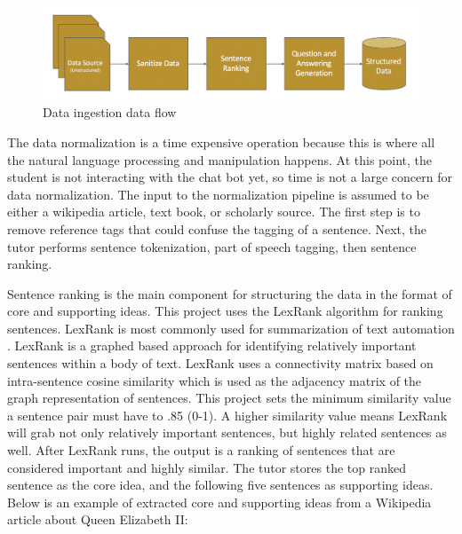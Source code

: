 \documentclass{sigchi}
\begin{document}
  \begin{figure}[!t]
  \centering
  \includegraphics[width=6.0in]{normalization}
  \caption{Data ingestion data flow}
  \label{data-normalization}
  \end{figure}

  The data normalization is a time expensive operation because this is where all the natural language processing and manipulation happens. At this point, the student is not interacting with the chat bot yet, so time is not a large concern for data normalization. The input to the normalization pipeline is assumed to be either a wikipedia article, text book, or scholarly source. The first step is to remove reference tags that could confuse the tagging of a sentence. Next, the tutor performs sentence tokenization, part of speech tagging, then sentence ranking.

  Sentence ranking is the main component for structuring the data in the format of core and supporting ideas. This project uses the LexRank algorithm for ranking sentences. LexRank is most commonly used for summarization of text automation \cite{LexRank}. LexRank is a graphed based approach for identifying relatively important sentences within a body of text. LexRank uses a connectivity matrix based on intra-sentence cosine similarity which is used as the adjacency matrix of the graph representation of sentences. This project sets the minimum similarity value a sentence pair must have to .85 (0-1). A higher similarity value means LexRank will grab not only relatively important sentences, but highly related sentences as well. After LexRank runs, the output is a ranking of sentences that are considered important and highly similar. The tutor stores the top ranked sentence as the core idea, and the following five sentences as supporting ideas. Below is an example of extracted core and supporting ideas from a Wikipedia article about Queen Elizabeth II:
\end{document}
